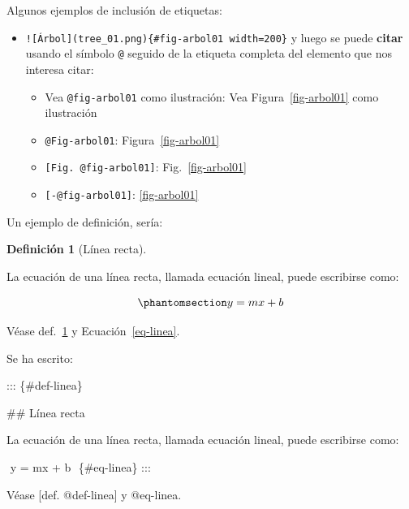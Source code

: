 \documentclass[
  11pt,
  a4paper,
  DIV=11,
  numbers=noendperiod]{scrartcl}
\newenvironment{Shaded}{\begin{snugshade}}{\end{snugshade}}
\newcommand{\CommentTok}[1]{\textcolor[rgb]{0.37,0.37,0.37}{#1}}
\newcommand{\FunctionTok}[1]{\textcolor[rgb]{0.28,0.35,0.67}{#1}}
\newcommand{\NormalTok}[1]{\textcolor[rgb]{0.00,0.23,0.31}{#1}}
\newcommand{\OtherTok}[1]{\textcolor[rgb]{0.00,0.23,0.31}{#1}}
\providecommand{\tightlist}{%
  \setlength{\itemsep}{0pt}\setlength{\parskip}{0pt}}\usepackage{longtable,booktabs,array}
\theoremstyle{definition}
\newtheorem{definition}{Definición}[section]
\theoremstyle{remark}
\begin{document}
Algunos ejemplos de inclusión de etiquetas:

\begin{itemize}
\item
  \texttt{!{[}Árbol{]}(tree\_01.png)\{\#fig-arbol01\ width=200\}} y
  luego se puede \textbf{citar} usando el símbolo \texttt{@} seguido de
  la etiqueta completa del elemento que nos interesa citar:

  \begin{itemize}
  \tightlist
  \item
    Vea \texttt{@fig-arbol01} como ilustración: Vea
    Figura~\ref{fig-arbol01} como ilustración
  \item
    \texttt{@Fig-arbol01}: Figura~\ref{fig-arbol01}
  \item
    \texttt{{[}Fig.\ @fig-arbol01{]}}: Fig.~\ref{fig-arbol01}
  \item
    \texttt{{[}-@fig-arbol01{]}}: \ref{fig-arbol01}
  \end{itemize}
\end{itemize}

Un ejemplo de definición, sería:

\begin{definition}[Línea
recta]\protect\hypertarget{def-linea}{}\label{def-linea}

La ecuación de una línea recta, llamada ecuación lineal, puede
escribirse como:

\begin{equation}\phantomsection\label{eq-linea}{
y = mx + b
}\end{equation}

\end{definition}

Véase def.~\ref{def-linea} y Ecuación~\ref{eq-linea}.

Se ha escrito:

\begin{Shaded}
\begin{Highlighting}[]
\NormalTok{::: \{\#def{-}linea\}}

\FunctionTok{\#\# Línea recta}

\NormalTok{La ecuación de una línea recta, llamada ecuación lineal, puede escribirse como:}

\NormalTok{$$}
\NormalTok{y = mx + b}
\NormalTok{$$ \{\#eq{-}linea\}}
\NormalTok{:::}

\NormalTok{Véase }\CommentTok{[}\OtherTok{def. @def{-}linea}\CommentTok{]}\NormalTok{ y @eq{-}linea.}
\end{Highlighting}
\end{Shaded}
\end{document}
